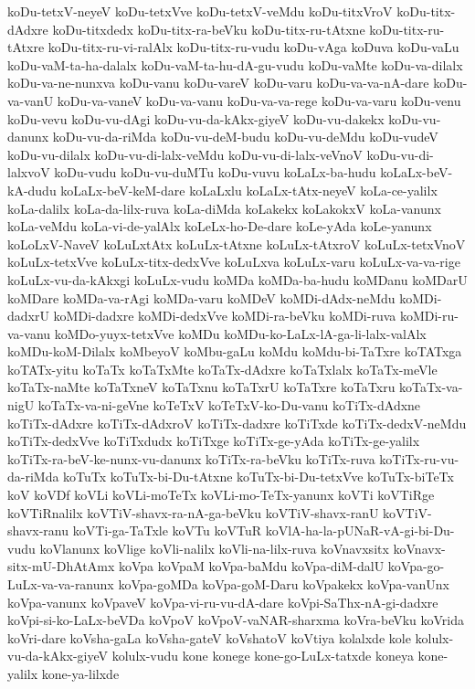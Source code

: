 {koDu-tetxV-neyeV
koDu-tetxVve
koDu-tetxV-veMdu
koDu-titxVroV
koDu-titx-dAdxre
koDu-titxdedx
koDu-titx-ra-beVku
koDu-titx-ru-tAtxne
koDu-titx-ru-tAtxre
koDu-titx-ru-vi-ralAlx
koDu-titx-ru-vudu
koDu-vAga
koDuva
koDu-vaLu
koDu-vaM-ta-ha-dalalx
koDu-vaM-ta-hu-dA-gu-vudu
koDu-vaMte
koDu-va-dilalx
koDu-va-ne-nunxva
koDu-vanu
koDu-vareV
koDu-varu
koDu-va-va-nA-dare
koDu-va-vanU
koDu-va-vaneV
koDu-va-vanu
koDu-va-va-rege
koDu-va-varu
koDu-venu
koDu-vevu
koDu-vu-dAgi
koDu-vu-da-kAkx-giyeV
koDu-vu-dakekx
koDu-vu-danunx
koDu-vu-da-riMda
koDu-vu-deM-budu
koDu-vu-deMdu
koDu-vudeV
koDu-vu-dilalx
koDu-vu-di-lalx-veMdu
koDu-vu-di-lalx-veVnoV
koDu-vu-di-lalxvoV
koDu-vudu
koDu-vu-duMTu
koDu-vuvu
koLaLx-ba-hudu
koLaLx-beV-kA-dudu
koLaLx-beV-keM-dare
koLaLxlu
koLaLx-tAtx-neyeV
koLa-ce-yalilx
koLa-dalilx
koLa-da-lilx-ruva
koLa-diMda
koLakekx
koLakokxV
koLa-vanunx
koLa-veMdu
koLa-vi-de-yalAlx
koLeLx-ho-De-dare
koLe-yAda
koLe-yanunx
koLoLxV-NaveV
koLuLxtAtx
koLuLx-tAtxne
koLuLx-tAtxroV
koLuLx-tetxVnoV
koLuLx-tetxVve
koLuLx-titx-dedxVve
koLuLxva
koLuLx-varu
koLuLx-va-va-rige
koLuLx-vu-da-kAkxgi
koLuLx-vudu
koMDa
koMDa-ba-hudu
koMDanu
koMDarU
koMDare
koMDa-va-rAgi
koMDa-varu
koMDeV
koMDi-dAdx-neMdu
koMDi-dadxrU
koMDi-dadxre
koMDi-dedxVve
koMDi-ra-beVku
koMDi-ruva
koMDi-ru-va-vanu
koMDo-yuyx-tetxVve
koMDu
koMDu-ko-LaLx-lA-ga-li-lalx-valAlx
koMDu-koM-Dilalx
koMbeyoV
koMbu-gaLu
koMdu
koMdu-bi-TaTxre
koTATxga
koTATx-yitu
koTaTx
koTaTxMte
koTaTx-dAdxre
koTaTxlalx
koTaTx-meVle
koTaTx-naMte
koTaTxneV
koTaTxnu
koTaTxrU
koTaTxre
koTaTxru
koTaTx-va-nigU
koTaTx-va-ni-geVne
koTeTxV
koTeTxV-ko-Du-vanu
koTiTx-dAdxne
koTiTx-dAdxre
koTiTx-dAdxroV
koTiTx-dadxre
koTiTxde
koTiTx-dedxV-neMdu
koTiTx-dedxVve
koTiTxdudx
koTiTxge
koTiTx-ge-yAda
koTiTx-ge-yalilx
koTiTx-ra-beV-ke-nunx-vu-danunx
koTiTx-ra-beVku
koTiTx-ruva
koTiTx-ru-vu-da-riMda
koTuTx
koTuTx-bi-Du-tAtxne
koTuTx-bi-Du-tetxVve
koTuTx-biTeTx
koV
koVDf
koVLi
koVLi-moTeTx
koVLi-mo-TeTx-yanunx
koVTi
koVTiRge
koVTiRnalilx
koVTiV-shavx-ra-nA-ga-beVku
koVTiV-shavx-ranU
koVTiV-shavx-ranu
koVTi-ga-TaTxle
koVTu
koVTuR
koVlA-ha-la-pUNaR-vA-gi-bi-Du-vudu
koVlanunx
koVlige
koVli-nalilx
koVli-na-lilx-ruva
koVnavxsitx
koVnavx-sitx-mU-DhAtAmx
koVpa
koVpaM
koVpa-baMdu
koVpa-diM-dalU
koVpa-go-LuLx-va-va-ranunx
koVpa-goMDa
koVpa-goM-Daru
koVpakekx
koVpa-vanUnx
koVpa-vanunx
koVpaveV
koVpa-vi-ru-vu-dA-dare
koVpi-SaThx-nA-gi-dadxre
koVpi-si-ko-LaLx-beVDa
koVpoV
koVpoV-vaNAR-sharxma
koVra-beVku
koVrida
koVri-dare
koVsha-gaLa
koVsha-gateV
koVshatoV
koVtiya
kolalxde
kole
kolulx-vu-da-kAkx-giyeV
kolulx-vudu
kone
konege
kone-go-LuLx-tatxde
koneya
kone-yalilx
kone-ya-lilxde
}
